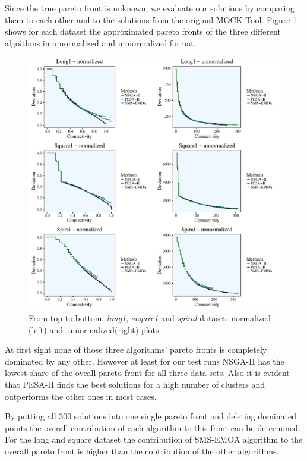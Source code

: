 \documentclass[parskip=half,DIV=14]{scrartcl}\usepackage[]{graphicx}\usepackage[]{color}
\begin{document}
Since the true pareto front is unknown, we evaluate our solutions by comparing them to each other and to the solutions from the original MOCK-Tool. Figure \ref{fig:comp} shows for each dataset the approximated pareto fronts of the three different algoithms in a normalized and unnormalized format.
\begin{figure}[!htb]
\begin{center}
\includegraphics[scale=0.70]{figure/Comparison.pdf}
\caption{From top to bottom: \emph{long1}, \emph{suqare1} and \emph{spiral} dataset: normalized (left) and unnormalized(right) plots}
\label{fig:comp}
\end{center}
\end{figure}


At first sight none of those three algorithms' pareto fronts is completely dominated by any other. However at least for our test runs NSGA-II has the lowest share of the oveall pareto front for all three data sets. Also it is evident that PESA-II finds the best solutions for a high number of clusters and outperforms the other ones in most cases.

By putting all 300 solutions into one single pareto front and deleting dominated points the overall contribution of each algorithm to this front can be determined. For the long and square dataset the contribution of SMS-EMOA algorithm to the overall pareto front is higher than the contribution of the other algorithms.
\end{document}
